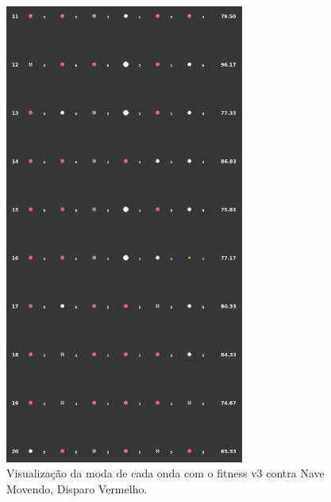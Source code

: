 \begin{figure}[H]
  \centering
  \includegraphics[width=0.7\textwidth]{figuras/ss/ss_redmove_ai_mode_2_2.png}
  \caption{Visualização da moda de cada onda com o fitness v3 contra Nave Movendo, Disparo Vermelho.}
  \label{fig:ss-moda-rm-2-2}
\end{figure}

